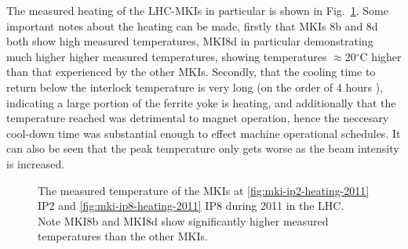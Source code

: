 The measured heating of the LHC-MKIs in particular is shown in Fig.~\ref{fig:mki-heating-2011}. Some important notes about the heating can be made, firstly that MKIs 8b and 8d both show high measured temperatures, MKI8d in particular demonstrating much higher higher measured temperatures, showing temperatures $\approx$20$^{\circ}$C higher than that experienced by the other MKIs. Secondly, that the cooling time to return below the interlock temperature is very long (on the order of 4 hours \cite{Goddard:timeConst}), indicating a large portion of the ferrite yoke is heating, and additionally that the temperature reached was detrimental to magnet operation, hence the neccesary cool-down time was substantial enough to effect machine operational schedules. It can also be seen that the peak temperature only gets worse as the beam intensity is increased.

\begin{figure}
\begin{center}
\end{center}
\caption{The measured temperature of the MKIs at \ref{fig:mki-ip2-heating-2011} IP2 and \ref{fig:mki-ip8-heating-2011} IP8 during 2011 in the LHC. Note MKI8b and MKI8d show significantly higher measured temperatures than the other MKIs.}
\label{fig:mki-heating-2011}
\end{figure}

